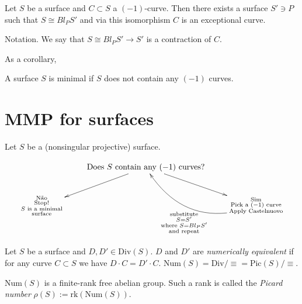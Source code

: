 \begin{theorem}
\label{theorem-castelnuovo}
Let $S$ be a surface and $C\subset S$ a
$(-1)$-curve.
Then there exists a surface $S' \ni P$ such
that
$S \cong Bl_PS'$ and via this isomorphism
$C$ is an exceptional curve.
\end{theorem}

\noindent
Notation. We say that $S\cong Bl_PS' \to S'$
is a contraction of $C$.

As a corollary,
\begin{corollary}
\label{lemma-corollary-castelnuovo}
A surface $S$ is minimal if $S$ does not
contain any $(-1)$ curves.
\end{corollary}

\section{MMP for surfaces}
\label{section-mmp-for-surfaces}

Let $S$ be a (nonsingular projective)
surface.

$$
\xymatrix{
&\text{Does $S$ contain any $(-1)$ curves?}
\ar[dl]\ar[dr]\\
\substack{\text{Não} \\ \text{Stop!}\\
\text{$S$ is a minimal}\\\text{surface}}
&  &
\substack{\text{Sim} \\ \text{Pick a $(-1)$
curve}\\
\text{Apply
Castelnuovo}}\ar@/^2.5pc/[ul]^{\substack{
\text{substitute} \\ S=S'\\\text{where
}S=Bl_PS'\\
\text{and repeat}}}
}
$$

\begin{definition}
\label{definition-numerical-equivalence}
Let $S$ be a surface and $D,D' \in
\text{Div}(S)$.
$D$ and $D'$ are {\it numerically equivalent}
if for any curve $C \subset S$
we have $D\cdot C= D'\cdot C$.
$\text{Num}(S)=\text{Div}/
\equiv=\text{Pic}(S)/\equiv$.
\end{definition}

\begin{theorem}
\label{theorem-num}
$\text{Num}(S)$ is a finite-rank free abelian
group.
Such a rank is called the {\it Picard number}
$\rho(S):=\text{rk}(\text{Num}(S))$.
\end{theorem}

